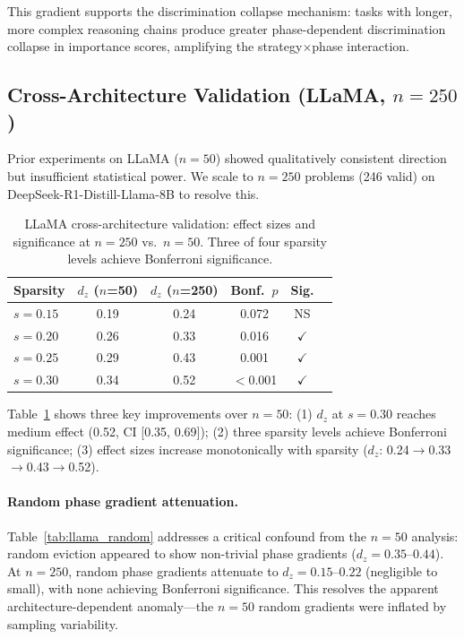 \documentclass[11pt,a4paper]{article}
\begin{document}
This gradient supports the discrimination collapse mechanism: tasks with longer, more complex reasoning chains produce greater phase-dependent discrimination collapse in importance scores, amplifying the strategy$\times$phase interaction.

\subsection{Cross-Architecture Validation (LLaMA, $n=250$)}
\label{sec:llama}

Prior experiments on LLaMA ($n=50$) showed qualitatively consistent direction but insufficient statistical power. We scale to $n=250$ problems (246 valid) on DeepSeek-R1-Distill-Llama-8B to resolve this.

\begin{table}[t]
\centering
\small
\caption{LLaMA cross-architecture validation: effect sizes and significance at $n=250$ vs.\ $n=50$. Three of four sparsity levels achieve Bonferroni significance.}
\label{tab:llama_n250}
\begin{tabular}{lccccc}
\toprule
Sparsity & $d_z$ ($n$=50) & $d_z$ ($n$=250) & Bonf.\ $p$ & Sig.\\
\midrule
$s=0.15$ & 0.19 & 0.24 & 0.072 & NS \\
$s=0.20$ & 0.26 & 0.33 & 0.016 & $\checkmark$ \\
$s=0.25$ & 0.29 & 0.43 & 0.001 & $\checkmark$ \\
$s=0.30$ & 0.34 & 0.52 & $<$0.001 & $\checkmark$ \\
\bottomrule
\end{tabular}
\end{table}

Table~\ref{tab:llama_n250} shows three key improvements over $n=50$: (1) $d_z$ at $s=0.30$ reaches medium effect (0.52, CI [0.35, 0.69]); (2) three sparsity levels achieve Bonferroni significance; (3) effect sizes increase monotonically with sparsity ($d_z$: 0.24$\to$0.33$\to$0.43$\to$0.52).

\paragraph{Random phase gradient attenuation.} Table~\ref{tab:llama_random} addresses a critical confound from the $n=50$ analysis: random eviction appeared to show non-trivial phase gradients ($d_z=0.35$--$0.44$). At $n=250$, random phase gradients attenuate to $d_z=0.15$--$0.22$ (negligible to small), with none achieving Bonferroni significance. This resolves the apparent architecture-dependent anomaly---the $n=50$ random gradients were inflated by sampling variability.
\end{document}
